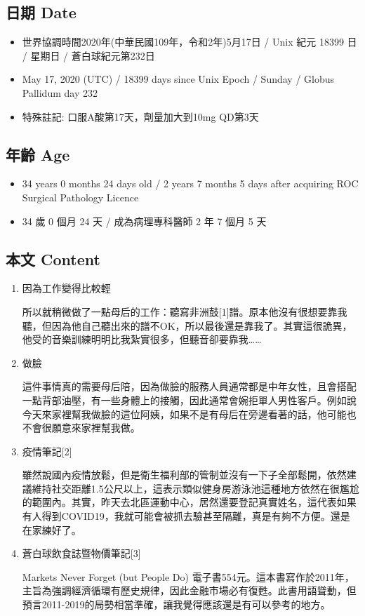 \documentclass[a5paper, 11pt
]{book}
\providecommand{\tightlist}{%
  \setlength{\itemsep}{0pt}\setlength{\parskip}{0pt}}
\begin{document}
\hypertarget{ux65e5ux671f-date-77}{%
\subsection{日期 Date}\label{ux65e5ux671f-date-77}}

\begin{itemize}
\tightlist
\item
  世界協調時間2020年(中華民國109年，令和2年)5月17日 / Unix 紀元 18399 日
  / 星期日 / 蒼白球紀元第232日
\item
  May 17, 2020 (UTC) / 18399 days since Unix Epoch / Sunday / Globus
  Pallidum day 232
\item
  特殊註記: 口服A酸第17天，劑量加大到10mg QD第3天
\end{itemize}

\hypertarget{ux5e74ux9f61-age-77}{%
\subsection{年齡 Age}\label{ux5e74ux9f61-age-77}}

\begin{itemize}
\tightlist
\item
  34 years 0 months 24 days old / 2 years 7 months 5 days after
  acquiring ROC Surgical Pathology Licence
\item
  34 歲 0 個月 24 天 / 成為病理專科醫師 2 年 7 個月 5 天
\end{itemize}

\hypertarget{ux672cux6587-content-77}{%
\subsection{本文 Content}\label{ux672cux6587-content-77}}

\begin{enumerate}
\def\labelenumi{\arabic{enumi}.}
\item
  因為工作變得比較輕

  所以就稍微做了一點母后的工作：聽寫非洲鼓{[}1{]}譜。原本他沒有很想要靠我聽，但因為他自己聽出來的譜不OK，所以最後還是靠我了。其實這很詭異，他受的音樂訓練明明比我紮實很多，但聽音卻要靠我\ldots\ldots{}
\item
  做臉

  這件事情真的需要母后陪，因為做臉的服務人員通常都是中年女性，且會搭配一點背部油壓，有一些身體上的接觸，因此通常會婉拒單人男性客戶。例如說今天來家裡幫我做臉的這位阿姨，如果不是有母后在旁邊看著的話，他可能也不會很願意來家裡幫我做。
\item
  疫情筆記{[}2{]}

  雖然說國內疫情放鬆，但是衛生福利部的管制並沒有一下子全部鬆開，依然建議維持社交距離1.5公尺以上，這表示類似健身房游泳池這種地方依然在很尷尬的範圍內。其實，昨天去北區運動中心，居然還要登記真實姓名，這代表如果有人得到COVID19，我就可能會被抓去驗甚至隔離，真是有夠不方便。還是在家練好了。
\item
  蒼白球飲食誌暨物價筆記{[}3{]}

  Markets Never Forget (but People Do)
  電子書554元。這本書寫作於2011年，主旨為強調經濟循環有歷史規律，因此金融市場必有復甦。此書用語聳動，但預言2011-2019的局勢相當準確，讓我覺得應該還是有可以參考的地方。
\end{enumerate}
\end{document}
